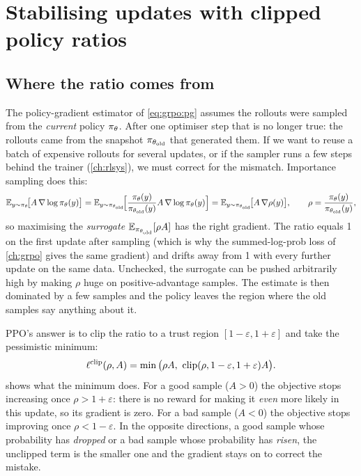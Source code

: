 \section{Stabilising updates with clipped policy ratios}\label{sec:grpo2:clip}

\subsection{Where the ratio comes from}\label{sec:grpo2:ratio}

The policy-gradient estimator of \cref{eq:grpo:pg} assumes the rollouts were sampled from the
\emph{current} policy $\pi_\theta$. After one optimiser step that is no longer true: the
rollouts came from the snapshot $\pi_{\theta_{\text{old}}}$ that generated them. If we want to reuse a batch
of expensive rollouts for several updates, or if the sampler runs a few steps behind the
trainer (\cref{ch:rlsys}), we must correct for the mismatch. Importance sampling does this:
\begin{equation}
\mathbb{E}_{y\sim\pi_\theta}\!\big[A\,\nabla\log\pi_\theta(y)\big]
=\mathbb{E}_{y\sim\pi_{\theta_{\text{old}}}}\!\Big[\frac{\pi_\theta(y)}{\pi_{\theta_{\text{old}}}(y)}A\,\nabla\log\pi_\theta(y)\Big]
=\mathbb{E}_{y\sim\pi_{\theta_{\text{old}}}}\!\big[A\,\nabla\rho(y)\big],\qquad \rho=\frac{\pi_\theta(y)}{\pi_{\theta_{\text{old}}}(y)},
\end{equation}
so maximising the \emph{surrogate} $\mathbb{E}_{\pi_{\theta_{\text{old}}}}[\rho A]$ has the right gradient. The ratio
equals 1 on the first update after sampling (which is why the summed-log-prob loss of
\cref{ch:grpo} gives the same gradient) and drifts away from 1 with every further update on
the same data. Unchecked, the surrogate can be pushed arbitrarily high by making $\rho$ huge
on positive-advantage samples. The estimate is then dominated by a few samples and the
policy leaves the region where the old samples say anything about it.

PPO's answer is to clip the ratio to a trust region $[1-\varepsilon,1+\varepsilon]$ and take
the pessimistic minimum:
\begin{equation}
\ell^{\text{clip}}(\rho,A)=\min\big(\rho A,\ \clip(\rho,1-\varepsilon,1+\varepsilon)A\big).
\label{eq:grpo2:clip}
\end{equation}
 shows what the minimum does. For a good sample ($A>0$) the
objective stops increasing once $\rho>1+\varepsilon$: there is no reward for making it
\emph{even} more likely in this update, so its gradient is zero. For a bad sample ($A<0$) the
objective stops improving once $\rho<1-\varepsilon$. In the opposite directions, a good sample
whose probability has \emph{dropped} or a bad sample whose probability has \emph{risen}, the
unclipped term is the smaller one and the gradient stays on to correct the mistake.

